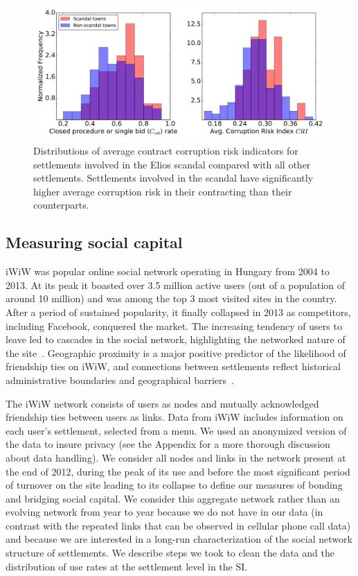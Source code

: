 \begin{figure}
\includegraphics[width=\textwidth]{images/iwiw/elios_dists.pdf}
\caption[Distributions of corruption risk in scandal towns.]{Distributions of average contract corruption risk indicators for settlements involved in the Elios scandal compared with all other settlements. Settlements involved in the scandal have significantly higher average corruption risk in their contracting than their counterparts.}
\label{fig:elios_dist}
\end{figure}


\subsection{Measuring social capital}
iWiW was popular online social network operating in Hungary from 2004 to 2013. At its peak it boasted over 3.5 million active users (out of a population of around 10 million) and was among the top 3 most visited sites in the country. After a period of sustained popularity, it finally collapsed in 2013 as competitors, including Facebook, conquered the market. The increasing tendency of users to leave led to cascades in the social network, highlighting the networked nature of the site~\cite{torok2017cascading,lorincz2017collapse}. Geographic proximity is a major positive predictor of the likelihood of friendship ties on iWiW, and connections between settlements reflect historical administrative boundaries and geographical barriers~\cite{lengyel2015geographies}.

The iWiW network consists of users as nodes and mutually acknowledged friendship ties between users as links. Data from iWiW includes information on each user's settlement, selected from a menu. We used an anonymized version of the data to insure privacy (see the Appendix for a more thorough discussion about data handling). We consider all nodes and links in the network present at the end of 2012, during the peak of its use and before the most significant period of turnover on the site leading to its collapse to define our measures of bonding and bridging social capital. We consider this aggregate network rather than an evolving network from year to year because we do not have  in our data (in contrast with the repeated links that can be observed in cellular phone call data) and because we are interested in a long-run characterization of the social network structure of settlements. We describe steps we took to clean the data and the distribution of use rates at the settlement level in the SI.


